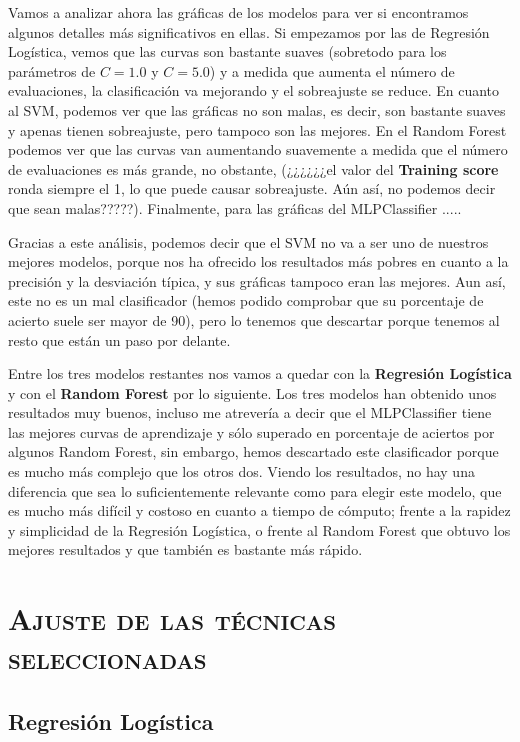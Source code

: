 \documentclass[11pt,a4paper]{article}
\begin{document}
Vamos a analizar ahora las gráficas de los modelos para ver si encontramos algunos detalles más significativos en ellas. Si empezamos por
las de Regresión Logística, vemos que las curvas son bastante suaves (sobretodo para los parámetros de $C = 1.0$ y $C = 5.0$) y a medida
que aumenta el número de evaluaciones, la clasificación va mejorando y el sobreajuste se reduce. En cuanto al SVM, podemos ver que las
gráficas no son malas, es decir, son bastante suaves y apenas tienen sobreajuste, pero tampoco son las mejores. En el Random Forest podemos
ver que las curvas van aumentando suavemente a medida que el número de evaluaciones es más grande, no obstante, (¿¿¿¿¿¿el valor del
\textbf{Training score} ronda siempre el 1, lo que puede causar sobreajuste. Aún así, no podemos decir que sean malas?????). Finalmente,
para las gráficas del MLPClassifier .....

Gracias a este análisis, podemos decir que el SVM no va a ser uno de nuestros mejores modelos, porque nos ha ofrecido los resultados más
pobres en cuanto a la precisión y la desviación típica, y sus gráficas tampoco eran las mejores. Aun así, este no es un mal clasificador
(hemos podido comprobar que su porcentaje de acierto suele ser mayor de 90), pero lo tenemos que descartar porque tenemos al resto que
están un paso por delante.

Entre los tres modelos restantes nos vamos a quedar con la \textbf{Regresión Logística} y con el \textbf{Random Forest} por lo siguiente.
Los tres modelos han obtenido unos resultados muy buenos, incluso me atrevería a decir que el MLPClassifier tiene las mejores curvas de
aprendizaje y sólo superado en porcentaje de aciertos por algunos Random Forest, sin embargo, hemos descartado este clasificador porque es
mucho más complejo que los otros dos. Viendo los resultados, no hay una diferencia que sea lo suficientemente relevante como para elegir
este modelo, que es mucho más difícil y costoso en cuanto a tiempo de cómputo; frente a la rapidez y simplicidad de la Regresión Logística,
o frente al Random Forest que obtuvo los mejores resultados y que también es bastante más rápido.

\section{\textsc{Ajuste de las técnicas seleccionadas}}

\subsection{Regresión Logística}
\end{document}
